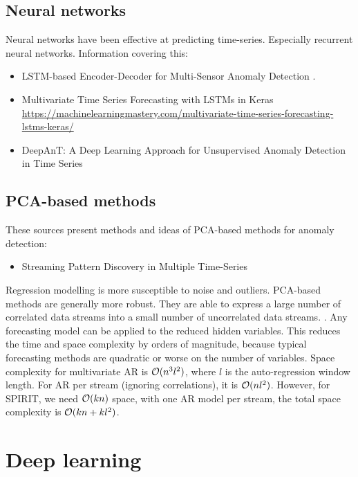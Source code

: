 \subsection{Neural networks} Neural networks have been effective at predicting time-series. Especially recurrent neural networks. Information covering this:
\begin{itemize}
    \item LSTM-based Encoder-Decoder for Multi-Sensor Anomaly Detection \cite{Malhotra2016a}.
    \item Multivariate Time Series Forecasting with LSTMs in Keras \newline \url{https://machinelearningmastery.com/multivariate-time-series-forecasting-lstms-keras/}
    \item DeepAnT: A Deep Learning Approach for Unsupervised Anomaly Detection in Time Series \cite{Munir2019DeepAnT:Series}
\end{itemize}


\subsection{PCA-based methods} These sources present methods and ideas of PCA-based methods for anomaly detection:
\begin{itemize}
    \item Streaming Pattern Discovery in Multiple Time-Series \cite{Papadimitriou2005StreamingTime-series}
\end{itemize}

Regression modelling is more susceptible to noise and outliers. PCA-based methods are generally more robust. They are able to express a large number of correlated data streams into a small number of uncorrelated data streams. \cite{Aggarwal2013a}. Any forecasting model can be applied to the reduced hidden variables. This reduces the time and space complexity by orders of magnitude, because typical forecasting methods are quadratic or worse on the number of variables. Space complexity for multivariate AR is $\mathcal{O}{(n^3l^2)}$, where $l$ is the auto-regression window length. For AR per stream (ignoring correlations), it is $\mathcal{O}{(nl^2)}$. However, for SPIRIT, we need $\mathcal{O}{(kn)}$ space, with one AR model per stream, the total space complexity is $\mathcal{O}{(kn+kl^2)}$. \cite{Papadimitriou2005StreamingTime-series}


\section{Deep learning}
